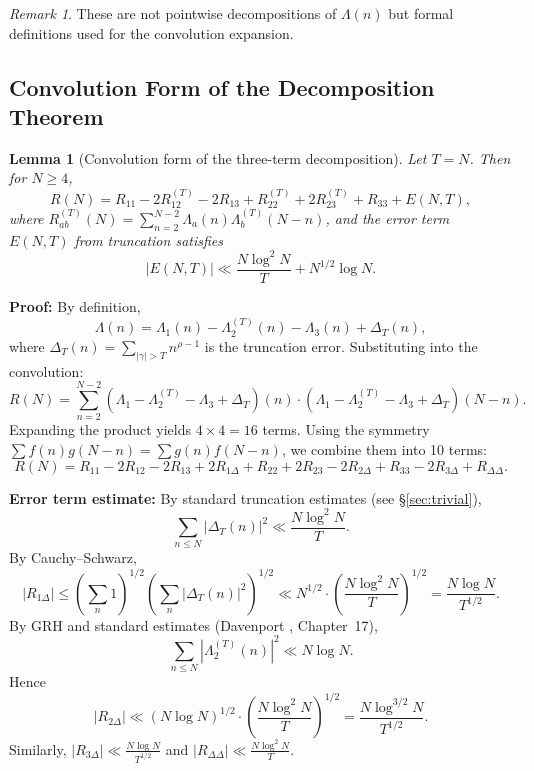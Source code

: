 \documentclass[11pt,a4paper]{article}
\newtheorem{lemma}[theorem]{Lemma}
\theoremstyle{remark}
\newtheorem{remark}[theorem]{Remark}
\begin{document}
\begin{remark}\label{rem:decomp}
These are not pointwise decompositions of $\Lambda(n)$ but formal definitions used for the convolution expansion.
\end{remark}

\subsection{Convolution Form of the Decomposition Theorem}

\begin{lemma}[Convolution form of the three-term decomposition]\label{lem:threeterm}
Let $T = N$. Then for $N \geq 4$,
\begin{equation}\label{eq:Rexpand}
R(N) = R_{11} - 2R_{12}^{(T)} - 2R_{13} + R_{22}^{(T)} + 2R_{23}^{(T)} + R_{33} + E(N,T),
\end{equation}
where $R_{ab}^{(T)}(N) = \sum_{n=2}^{N-2} \Lambda_a(n)\Lambda_b^{(T)}(N-n)$, and the error term $E(N,T)$ from truncation satisfies
\begin{equation}\label{eq:Ebound}
|E(N,T)| \ll \frac{N\log^2 N}{T} + N^{1/2}\log N.
\end{equation}
\end{lemma}

\noindent\textbf{Proof:} By definition,
\[
\Lambda(n) = \Lambda_1(n) - \Lambda_2^{(T)}(n) - \Lambda_3(n) + \Delta_T(n),
\]
where $\Delta_T(n) = \sum_{|\gamma| > T} n^{\rho-1}$ is the truncation error. Substituting into the convolution:
\[
R(N) = \sum_{n=2}^{N-2} (\Lambda_1 - \Lambda_2^{(T)} - \Lambda_3 + \Delta_T)(n) \cdot (\Lambda_1 - \Lambda_2^{(T)} - \Lambda_3 + \Delta_T)(N-n).
\]
Expanding the product yields $4 \times 4 = 16$ terms. Using the symmetry $\sum f(n)g(N-n) = \sum g(n)f(N-n)$, we combine them into 10 terms:
\[
R(N) = R_{11} - 2R_{12} - 2R_{13} + 2R_{1\Delta} + R_{22} + 2R_{23} - 2R_{2\Delta} + R_{33} - 2R_{3\Delta} + R_{\Delta\Delta}.
\]

\noindent\textbf{Error term estimate:} By standard truncation estimates (see \S\ref{sec:trivial}),
\[
\sum_{n \leq N} |\Delta_T(n)|^2 \ll \frac{N\log^2 N}{T}.
\]
By Cauchy--Schwarz,
\[
|R_{1\Delta}| \leq \left(\sum_n 1\right)^{1/2} \left(\sum_n |\Delta_T(n)|^2\right)^{1/2} \ll N^{1/2} \cdot \left(\frac{N\log^2 N}{T}\right)^{1/2} = \frac{N\log N}{T^{1/2}}.
\]
By GRH and standard estimates (Davenport \cite{davenport}, Chapter~17),
\[
\sum_{n \leq N} |\Lambda_2^{(T)}(n)|^2 \ll N\log N.
\]
Hence
\[
|R_{2\Delta}| \ll (N\log N)^{1/2} \cdot \left(\frac{N\log^2 N}{T}\right)^{1/2} = \frac{N\log^{3/2} N}{T^{1/2}}.
\]
Similarly, $|R_{3\Delta}| \ll \frac{N\log N}{T^{1/2}}$ and $|R_{\Delta\Delta}| \ll \frac{N\log^2 N}{T}$.
\end{document}

